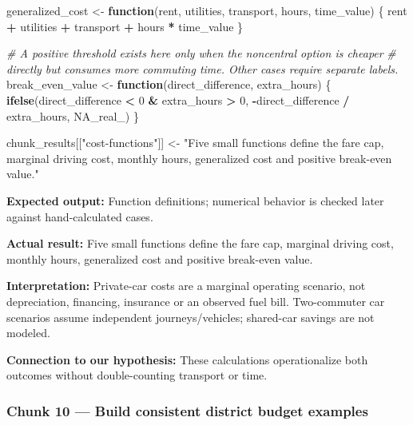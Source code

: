 \documentclass[
]{article}
\newenvironment{Shaded}{\begin{snugshade}}{\end{snugshade}}
\newcommand{\CommentTok}[1]{\textcolor[rgb]{0.56,0.35,0.01}{\textit{#1}}}
\newcommand{\ConstantTok}[1]{\textcolor[rgb]{0.56,0.35,0.01}{#1}}
\newcommand{\ControlFlowTok}[1]{\textcolor[rgb]{0.13,0.29,0.53}{\textbf{#1}}}
\newcommand{\DecValTok}[1]{\textcolor[rgb]{0.00,0.00,0.81}{#1}}
\newcommand{\FunctionTok}[1]{\textcolor[rgb]{0.13,0.29,0.53}{\textbf{#1}}}
\newcommand{\NormalTok}[1]{#1}
\newcommand{\OtherTok}[1]{\textcolor[rgb]{0.56,0.35,0.01}{#1}}
\newcommand{\SpecialCharTok}[1]{\textcolor[rgb]{0.81,0.36,0.00}{\textbf{#1}}}
\newcommand{\StringTok}[1]{\textcolor[rgb]{0.31,0.60,0.02}{#1}}
\begin{document}
\begin{Shaded}
\begin{Highlighting}[]
\NormalTok{generalized\_cost }\OtherTok{\textless{}{-}} \ControlFlowTok{function}\NormalTok{(rent, utilities, transport, hours, time\_value) \{}
\NormalTok{  rent }\SpecialCharTok{+}\NormalTok{ utilities }\SpecialCharTok{+}\NormalTok{ transport }\SpecialCharTok{+}\NormalTok{ hours }\SpecialCharTok{*}\NormalTok{ time\_value}
\NormalTok{\}}

\CommentTok{\# A positive threshold exists here only when the noncentral option is cheaper}
\CommentTok{\# directly but consumes more commuting time. Other cases require separate labels.}
\NormalTok{break\_even\_value }\OtherTok{\textless{}{-}} \ControlFlowTok{function}\NormalTok{(direct\_difference, extra\_hours) \{}
  \FunctionTok{ifelse}\NormalTok{(direct\_difference }\SpecialCharTok{\textless{}} \DecValTok{0} \SpecialCharTok{\&}\NormalTok{ extra\_hours }\SpecialCharTok{\textgreater{}} \DecValTok{0}\NormalTok{,}
         \SpecialCharTok{{-}}\NormalTok{direct\_difference }\SpecialCharTok{/}\NormalTok{ extra\_hours, }\ConstantTok{NA\_real\_}\NormalTok{)}
\NormalTok{\}}

\NormalTok{chunk\_results[[}\StringTok{"cost{-}functions"}\NormalTok{]] }\OtherTok{\textless{}{-}} \StringTok{"Five small functions define the fare cap, marginal driving cost, monthly hours, generalized cost and positive break{-}even value."}
\end{Highlighting}
\end{Shaded}

\textbf{Expected output:} Function definitions; numerical behavior is
checked later against hand-calculated cases.

\textbf{Actual result:} Five small functions define the fare cap,
marginal driving cost, monthly hours, generalized cost and positive
break-even value.

\textbf{Interpretation:} Private-car costs are a marginal operating
scenario, not depreciation, financing, insurance or an observed fuel
bill. Two-commuter car scenarios assume independent journeys/vehicles;
shared-car savings are not modeled.

\textbf{Connection to our hypothesis:} These calculations operationalize
both outcomes without double-counting transport or time.

\subsubsection{Chunk 10 --- Build consistent district budget
examples}\label{chunk-10-build-consistent-district-budget-examples}
\end{document}
